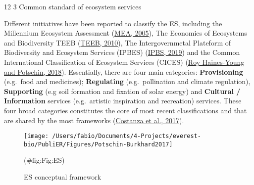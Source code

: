 \documentclass[]{elsarticle} %
\makeatletter
\renewcommand\subsection{\@startsection{subsection}{2}{\z@}%
         {12\p@ \@plus 6\p@ \@minus 3\p@}%
         {3\p@ \@plus 6\p@ \@minus 3\p@}%
         {\normalfont\normalsize\itshape\bfseries}}
\makeatother
\begin{document}
\hypertarget{common-standard-of-ecosystem-services}{%
\subsection{Common standard of ecosystem services}\label{common-standard-of-ecosystem-services}}

Different initiatives have been reported to classify the ES, including the Millennium Ecosystem Assessment (\protect\hyperlink{ref-MEA2005}{MEA, 2005}),
The Economics of Ecosystems and Biodiversity TEEB (\protect\hyperlink{ref-TEEB2010}{TEEB, 2010}),
The Intergovernmetal Plateform of Biodiversity and Ecosystem Services (IPBES) (\protect\hyperlink{ref-IPBS2019}{IPBS, 2019}) and the Common International Classification of Ecosystem Services (CICES) (\protect\hyperlink{ref-RoyHaines-Young2018}{Roy Haines-Young and Potschin, 2018}).
Essentially, there are four main categories:
\textbf{Provisioning} (e.g.~food and medicines);
\textbf{Regulating} (e.g.~pollination and climate regulation),
\textbf{Supporting} (e.g soil formation and fixation of solar energy) and
\textbf{Cultural / Information} services (e.g.~artistic inspiration and recreation) services.
These four broad categories constitutes the core of most recent classifications and that are shared by the most frameworks (\protect\hyperlink{ref-Costanza2017}{Costanza et al., 2017}).

\begin{figure}[!ht]

{\centering \texttt{[image: /Users/fabio/Documents/4-Projects/everest-bio/PubliER/Figures/Potschin-Burkhard2017]} 

}

\caption{ES conceptual framework}(\#fig:Fig:ES)
\end{figure}
\end{document}
